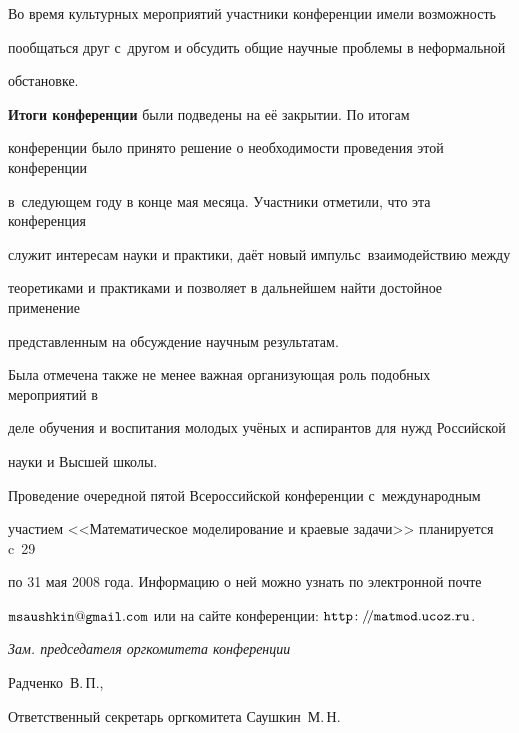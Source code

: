 Во время культурных мероприятий участники конференции имели возможность 

пообщаться друг с~другом и обсудить общие научные проблемы в неформальной 

обстановке.



\textbf{Итоги конференции} были подведены на её закрытии. По итогам 

конференции было принято решение о необходимости проведения этой конференции 

в~следующем году в конце мая месяца. Участники отметили, что эта конференция 

служит интересам науки и практики, даёт новый импульс~взаимодействию между 

теоретиками и практиками и позволяет в дальнейшем найти достойное применение 

представленным на обсуждение научным результатам.



Была отмечена также не менее важная организующая роль подобных мероприятий в 

деле обучения и воспитания молодых учёных и аспирантов для нужд Российской 

науки и Высшей школы.



Проведение очередной пятой Всероссийской конференции с~международным 

участием <<Математическое моделирование и краевые задачи>> планируется c~29 

по 31 мая 2008 года. Информацию о ней можно узнать по электронной почте 

${\tt msaushkin@gmail.com}$ или на сайте конференции: ${\tt http\!:/\!/matmod.ucoz.ru}$.



\lfoot[]{}

  \rfoot[]{}

\begin{flushright} {\it Зам. председателя оргкомитета конференции

Радченко~В.\,П., \par Ответственный секретарь оргкомитета Саушкин~М.\,Н.}

\end{flushright}











%

